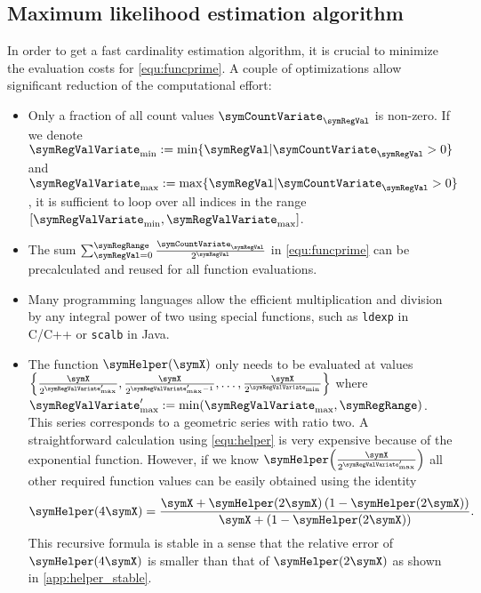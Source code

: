 \documentclass[a4paper]{scrartcl}
\begin{document}
\subsection{Maximum likelihood estimation algorithm}
In order to get a fast cardinality estimation algorithm, it is crucial to minimize the evaluation costs for \eqref{equ:funcprime}. A couple of optimizations allow significant reduction of the computational effort:
\begin{itemize}
\item Only a fraction of all count values $\symCountVariate_\symRegVal$ is non-zero. If we denote $\symRegValVariate_\text{min}:=\min\lbrace \symRegVal\vert\symCountVariate_\symRegVal>0\rbrace$ and $\symRegValVariate_\text{max}:=\max\lbrace \symRegVal\vert\symCountVariate_\symRegVal>0\rbrace$,  it is sufficient to loop over all indices in the range $[\symRegValVariate_\text{min}, \symRegValVariate_\text{max}]$.
\item The sum $\sum_{\symRegVal=0}^\symRegRange \frac{\symCountVariate_\symRegVal}{2^\symRegVal}$ in \eqref{equ:funcprime} can be precalculated and reused for all function evaluations.
\item Many programming languages allow the efficient multiplication and division by any integral power of two using special functions, such as \texttt{ldexp} in C/C++ or \texttt{scalb} in Java.
\item The function $\symHelper(\symX)$ only needs to be evaluated at values $\left\lbrace\frac{\symX}{2^{\symRegValVariate'_\text{max}}},\frac{\symX}{2^{\symRegValVariate'_\text{max}-1}},\ldots,\frac{\symX}{2^{\symRegValVariate_\text{min}}}\right\rbrace$ where $\symRegValVariate'_\text{max} := \min(\symRegValVariate_\text{max}, \symRegRange)$. This series corresponds to a geometric series with ratio two. A straightforward calculation using \eqref{equ:helper} is very expensive because of the exponential function. However, if we know $\symHelper\!\left(\frac{\symX}{2^{\symRegValVariate'_\text{max}}}\right)$ all other required function values can be easily obtained using the identity
\begin{equation}
\label{equ:helper_recursion1}
\symHelper(4\symX) = \frac{\symX+\symHelper(2\symX)\left(1-\symHelper(2\symX)\right)}{\symX+\left(1-\symHelper(2\symX)\right)}.
\end{equation}
This recursive formula is stable in a sense that the relative error of $\symHelper(4\symX)$ is smaller than that of $\symHelper(2\symX)$ as shown in \cref{app:helper_stable}.


\end{itemize}
\end{document}
